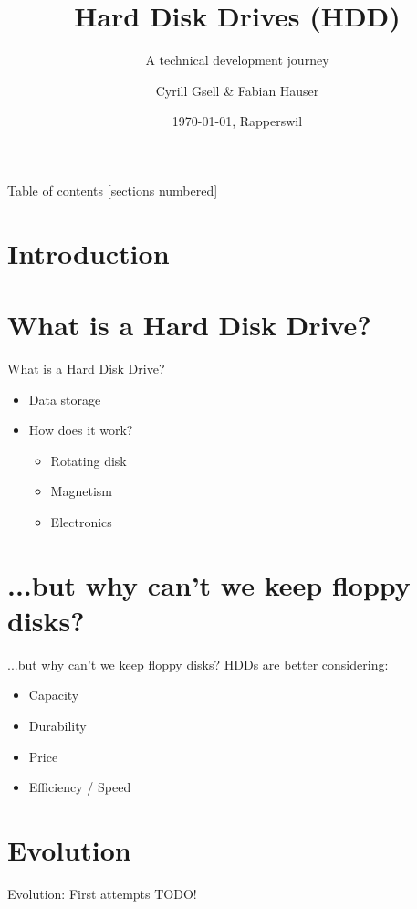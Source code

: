\documentclass[12pt]{beamer}
\title{Hard Disk Drives (HDD)}
\subtitle{A technical development journey}
\date{\today, Rapperswil}
\author{Cyrill Gsell \& Fabian Hauser}
\institute{Computer Science \\
	TecBEC Presentation FS 2016}
\newlength{\wideitemsep}
\let\olditem\item
\renewcommand{\item}{\setlength{\itemsep}{\wideitemsep}\olditem}
\begin{document}
\maketitle

\begin{frame}{Table of contents}
  [sections numbered]
  \tableofcontents
\end{frame}

\section{Introduction}
\section{What is a Hard Disk Drive?}
\begin{frame}[fragile]{What is a Hard Disk Drive?}
	\begin{itemize}
		\item Data storage
		\item How does it work?
			\begin{itemize}
				\item Rotating disk
				\item Magnetism
				\item Electronics
			\end{itemize}
	\end{itemize}
\end{frame}

\section{...but why can't we keep floppy disks?}
\begin{frame}[fragile]{...but why can't we keep floppy disks?}
	HDDs are better considering:
	\begin{itemize}
		\item Capacity
		\item Durability
		\item Price
		\item Efficiency / Speed
	\end{itemize}		
\end{frame}

\section{Evolution}
\begin{frame}[fragile]{Evolution: First attempts}
	TODO!
\end{frame}
\end{document}
